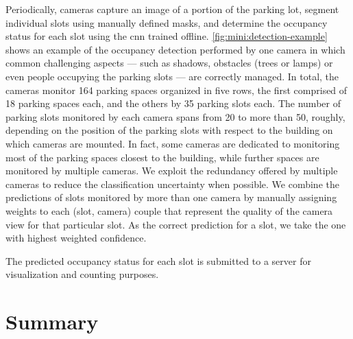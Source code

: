 Periodically, cameras capture an image of a portion of the parking lot, segment individual slots using manually defined masks, and determine the occupancy status for each slot using the \gls{cnn} trained offline.
\ref{fig:mini:detection-example} shows an example of the occupancy detection performed by one camera in which common challenging aspects --- such as shadows, obstacles (trees or lamps) or even people occupying the parking slots --- are correctly managed.
In total, the cameras monitor 164 parking spaces organized in five rows, the first comprised of 18 parking spaces each, and the others by 35 parking slots each.
The number of parking slots monitored by each camera spans from 20 to more than 50, roughly, depending on the position of the parking slots with respect to the building on which cameras are mounted.
In fact, some cameras are dedicated to monitoring most of the parking spaces closest to the building, while further spaces are monitored by multiple cameras.
We exploit the redundancy offered by multiple cameras to reduce the classification uncertainty when possible.
We combine the predictions of slots monitored by more than one camera by manually assigning weights to each (slot, camera) couple that represent the quality of the camera view for that particular slot.
As the correct prediction for a slot, we take the one with highest weighted confidence.

The predicted occupancy status for each slot is submitted to a server for visualization and counting purposes.


\section{Summary}
\label{sec:mini:conclusions}


